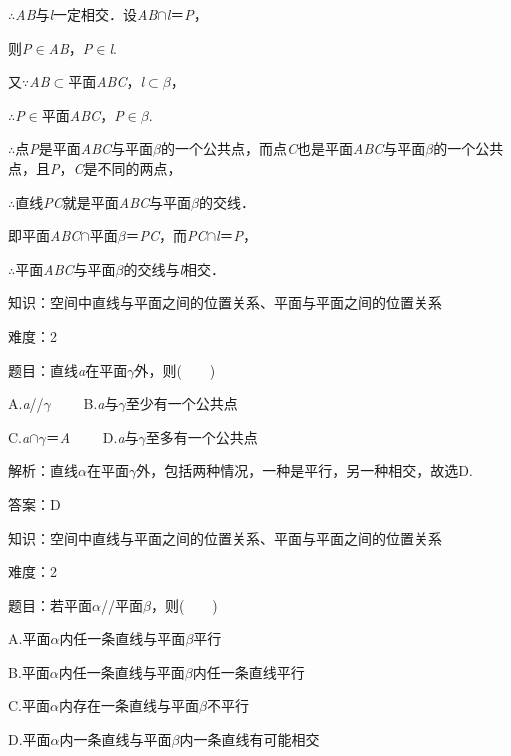 \documentclass{article} %
\begin{document}
$\mathrm{\therefore}$\textit{AB}与\textit{l}一定相交．设\textit{AB}$\mathrm{\cap}$\textit{l}＝\textit{P}，

则\textit{P}$\mathrm{\in}$\textit{AB}，\textit{P}$\mathrm{\in}$\textit{l}.

又$\mathrm{\because}$\textit{AB}$\mathrm{\subset }$平面\textit{ABC}，\textit{l}$\mathrm{\subset }$\textit{$\beta$}，

$\mathrm{\therefore}$\textit{P}$\mathrm{\in}$平面\textit{ABC}，\textit{P}$\mathrm{\in}$\textit{$\beta$}.

$\mathrm{\therefore}$点\textit{P}是平面\textit{ABC}与平面\textit{$\beta$}的一个公共点，而点\textit{C}也是平面\textit{ABC}与平面\textit{$\beta$}的一个公共点，且\textit{P}，\textit{C}是不同的两点，

$\mathrm{\therefore}$直线\textit{PC}就是平面\textit{ABC}与平面\textit{$\beta$}的交线．

即平面\textit{ABC}$\mathrm{\cap}$平面\textit{$\beta$}＝\textit{PC}，而\textit{PC}$\mathrm{\cap}$\textit{l}＝\textit{P}，

$\mathrm{\therefore}$平面\textit{ABC}与平面\textit{$\beta$}的交线与\textit{l}相交．

知识：空间中直线与平面之间的位置关系、平面与平面之间的位置关系

难度：2

题目：直线\textit{a}在平面\textit{$\gamma$}外，则(　　)

A.\textit{a}//\textit{$\gamma$}　　  B.\textit{a}与\textit{$\gamma$}至少有一个公共点

C.\textit{a}$\mathrm{\cap}$\textit{$\gamma$}＝\textit{A}　　  D.\textit{a}与\textit{$\gamma$}至多有一个公共点

解析：直线\textit{$\alpha$}在平面\textit{$\gamma$}外，包括两种情况，一种是平行，另一种相交，故选D.

答案：D

知识：空间中直线与平面之间的位置关系、平面与平面之间的位置关系

难度：2

题目：若平面\textit{$\alpha$}//平面\textit{$\beta$}，则(　　)

A.平面\textit{$\alpha$}内任一条直线与平面\textit{$\beta$}平行

B.平面\textit{$\alpha$}内任一条直线与平面\textit{$\beta$}内任一条直线平行

C.平面\textit{$\alpha$}内存在一条直线与平面\textit{$\beta$}不平行

D.平面\textit{$\alpha$}内一条直线与平面\textit{$\beta$}内一条直线有可能相交
\end{document}
